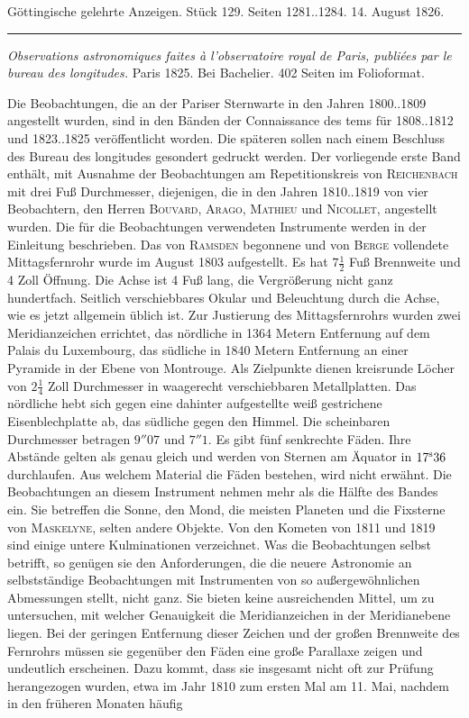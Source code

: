 \clearpage
{}
\hypertarget{native-646-lower}{}
\begin{center}\small Göttingische gelehrte Anzeigen. Stück 129. Seiten 1281..1284. 14. August 1826.\\[3pt]\rule{.72\linewidth}{.3pt}\end{center}

\emph{Observations astronomiques faites à l'observatoire royal de Paris, publiées par le bureau des longitudes.} Paris 1825. Bei Bachelier. 402 Seiten im Folioformat.

Die Beobachtungen, die an der Pariser Sternwarte in den Jahren 1800..1809 angestellt wurden, sind in den Bänden der Connaissance des tems für 1808..1812 und 1823..1825 veröffentlicht worden. Die späteren sollen nach einem Beschluss des Bureau des longitudes gesondert gedruckt werden. Der vorliegende erste Band enthält, mit Ausnahme der Beobachtungen am Repetitionskreis von \textsc{Reichenbach} mit drei Fuß Durchmesser, diejenigen, die in den Jahren 1810..1819 von vier Beobachtern, den Herren \textsc{Bouvard}, \textsc{Arago}, \textsc{Mathieu} und \textsc{Nicollet}, angestellt wurden. Die für die Beobachtungen verwendeten Instrumente werden in der Einleitung beschrieben. Das von \textsc{Ramsden} begonnene und von \textsc{Berge} vollendete Mittagsfernrohr wurde im August 1803 aufgestellt. Es hat $7\frac{1}{2}$ Fuß Brennweite und 4 Zoll Öffnung. Die Achse ist 4 Fuß lang, die Vergrößerung nicht ganz hundertfach. Seitlich verschiebbares Okular und Beleuchtung durch die Achse, wie es jetzt allgemein üblich ist. Zur Justierung des Mittagsfernrohrs wurden zwei Meridianzeichen errichtet, das nördliche in 1364 Metern Entfernung auf dem Palais du Luxembourg, das südliche in 1840 Metern Entfernung an einer Pyramide in der Ebene von Montrouge. Als Zielpunkte dienen kreisrunde Löcher von $2\frac{1}{4}$ Zoll Durchmesser in waagerecht verschiebbaren Metallplatten. Das nördliche hebt sich gegen eine dahinter aufgestellte weiß gestrichene Eisenblechplatte ab, das südliche gegen den Himmel. Die scheinbaren Durchmesser betragen $9''07$ und $7''1$. Es gibt fünf senkrechte Fäden. Ihre Abstände gelten als genau gleich und werden von Sternen am Äquator in $17^{\rm s}36$ durchlaufen. Aus welchem Material die Fäden bestehen, wird nicht erwähnt. Die Beobachtungen an diesem Instrument nehmen mehr als die Hälfte des Bandes ein. Sie betreffen die Sonne, den Mond, die meisten Planeten und die Fixsterne von \textsc{Maskelyne}, selten andere Objekte. Von den Kometen von 1811 und 1819 sind einige untere Kulminationen verzeichnet. Was die Beobachtungen selbst betrifft, so genügen sie den Anforderungen, die die neuere Astronomie an selbstständige Beobachtungen mit Instrumenten von so außergewöhnlichen Abmessungen stellt, nicht ganz. Sie bieten keine ausreichenden Mittel, um zu untersuchen, mit welcher Genauigkeit die Meridianzeichen in der Meridianebene liegen. Bei der geringen Entfernung dieser Zeichen und der großen Brennweite des Fernrohrs müssen sie gegenüber den Fäden eine große Parallaxe zeigen und undeutlich erscheinen. Dazu kommt, dass sie insgesamt nicht oft zur Prüfung herangezogen wurden, etwa im Jahr 1810 zum ersten Mal am 11. Mai, nachdem in den früheren Monaten häufig 